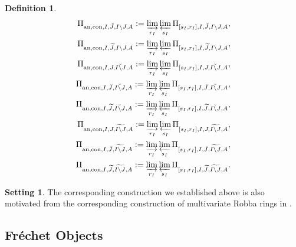 \documentclass[12pt]{amsart}
\theoremstyle{definition}
\newtheorem{definition}[theorem]{Definition}
\numberwithin{equation}{section}
\newtheorem{setting}[theorem]{Setting}
\begin{document}
\begin{definition}
\begin{align}
\Pi_{\mathrm{an},\mathrm{con},I,\breve{J},I\backslash J,A}:=\varinjlim_{r_I}\varprojlim_{s_I}\Pi_{[s_I,r_I],I,\breve{J},I\backslash J,A},\\	
\Pi_{\mathrm{an},\mathrm{con},I,\widetilde{J},I\backslash J,A}:=\varinjlim_{r_I}\varprojlim_{s_I} \Pi_{[s_I,r_I],I,\widetilde{J},I\backslash J,A},\\
\Pi_{\mathrm{an},\mathrm{con},I,J,\breve{I\backslash J},A}:=\varinjlim_{r_I}\varprojlim_{s_I}\Pi_{[s_I,r_I],I,J,\breve{I\backslash J},A},\\	
\Pi_{\mathrm{an},\mathrm{con},I,\breve{J},\breve{I\backslash J},A}:=\varinjlim_{r_I}\varprojlim_{s_I} \Pi_{[s_I,r_I],I,\breve{J},\breve{I\backslash J},A},\\
\Pi_{\mathrm{an},\mathrm{con},I,\widetilde{J},\breve{I\backslash J},A}:=\varinjlim_{r_I}\varprojlim_{s_I} \Pi_{[s_I,r_I],I,\widetilde{J},\breve{I\backslash J},A},\\
\Pi_{\mathrm{an},\mathrm{con},I,J,\widetilde{I\backslash J},A}:=\varinjlim_{r_I}\varprojlim_{s_I} \Pi_{[s_I,r_I],I,J,\widetilde{I\backslash J},A},\\	
\Pi_{\mathrm{an},\mathrm{con},I,\breve{J},\widetilde{I\backslash J},A}:=\varinjlim_{r_I}\varprojlim_{s_I} \Pi_{[s_I,r_I],I,\breve{J},\widetilde{I\backslash J},A},\\	
\Pi_{\mathrm{an},\mathrm{con},I,\widetilde{J},\widetilde{I\backslash J},A}:=\varinjlim_{r_I}\varprojlim_{s_I} \Pi_{[s_I,r_I],I,\widetilde{J},\widetilde{I\backslash J},A}.\\	
\end{align}	
\end{definition}






\begin{setting}
The corresponding construction we established above is also motivated from the corresponding construction of multivariate Robba rings in \cite{Ked2}.\\	
\end{setting}





\subsection{Fr\'echet Objects}
\end{document}
